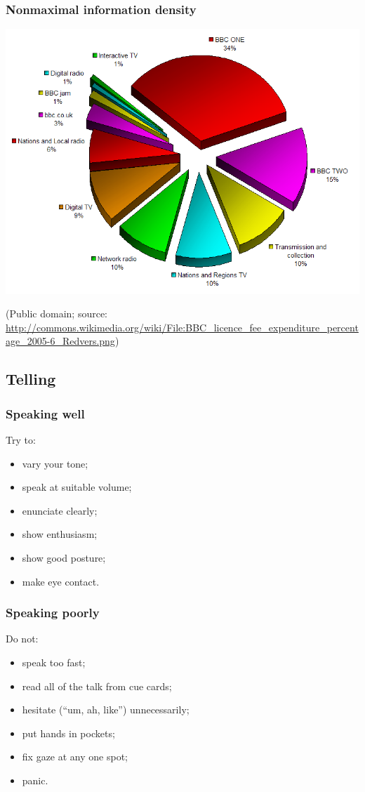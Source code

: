 \documentclass{beamer}
\begin{document}
\begin{frame}

\frametitle{Nonmaximal information density}

\begin{center}
\includegraphics[width=.65\textwidth]{3dpiechart.png}
\end{center}

(Public domain; source:
\url{http://commons.wikimedia.org/wiki/File:BBC_licence_fee_expenditure_percentage_2005-6_Redvers.png})

\end{frame}

\subsection{Telling}

\begin{frame}

\frametitle{Speaking well}

Try to:
\begin{itemize}
\item vary your tone;
\item speak at suitable volume;
\item enunciate clearly;
\item show enthusiasm;
\item show good posture;
\item make eye contact.
\end{itemize}

\end{frame}

\begin{frame}

\frametitle{Speaking poorly}

Do not:
\begin{itemize}
\item speak too fast;
\item read all of the talk from cue cards;
\item hesitate (``um, ah, like'') unnecessarily;
\item put hands in pockets;
\item fix gaze at any one spot;
\item panic.
\end{itemize}

\end{frame}
\end{document}

